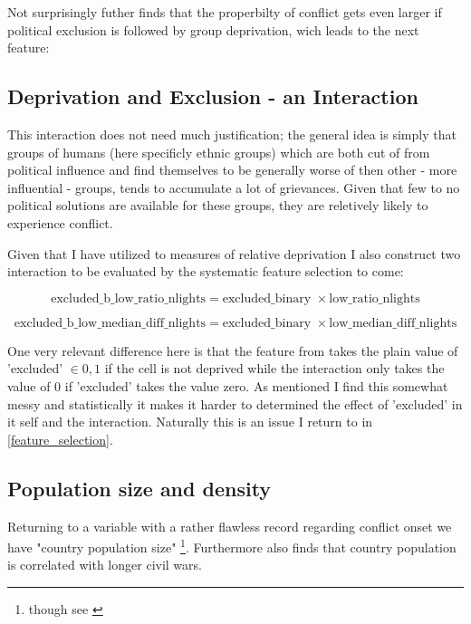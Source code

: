 \documentclass[a4paper]{article}
\begin{document}

Not surprisingly \cite{Cederman_Gleditsch_Buhaug_2013} futher finds that the properbilty of conflict gets even larger if political exclusion is followed by group deprivation, wich leads to the next feature:

\subsection{Deprivation and Exclusion - an Interaction}

This interaction does not need much justification; the general idea is simply that groups of humans (here specificly ethnic groups) which are both cut of from political influence and find themselves to be generally worse of then other - more influential - groups, tends to accumulate a lot of grievances. Given that few to no political solutions are available for these groups, they are reletively likely to experience conflict\cite[103-111]{Cederman_Gleditsch_Buhaug_2013}.\par

Given that I have utilized to measures of relative deprivation I also construct two interaction to be evaluated by the systematic feature selection to come:

$$ \textrm{excluded\_b\_low\_ratio\_nlights} = \textrm{excluded\_binary }\times \textrm{low\_ratio\_nlights} $$

$$ \textrm{excluded\_b\_low\_median\_diff\_nlights} = \textrm{excluded\_binary }\times \textrm{low\_median\_diff\_nlights} $$

One very relevant difference here is that the feature from \cite{Cederman_Gleditsch_Buhaug_2013} takes the plain value of 'excluded' $\in {0,1}$ if the cell is not deprived while the interaction only takes the value of 0 if 'excluded' takes the value zero. As mentioned I find this somewhat messy and statistically it makes it harder to determined the effect of 'excluded' in it self and the interaction. Naturally this is an issue I return to in \autoref{feature_selection}.\par

\subsection{Population size and density} 

Returning to a variable with a rather flawless record regarding conflict onset we have "country population size" \citep{Collier_Hoeffler_1998, Fearon_Laitin_2003, Collier_Hoeffler_2004, Hegre_Sambanis_2006}\footnote{though see \cite{Goldstone_2010}}. Furthermore \cite[287]{Fearon_2004} also finds that country population is correlated with longer civil wars.\par
\end{document}
